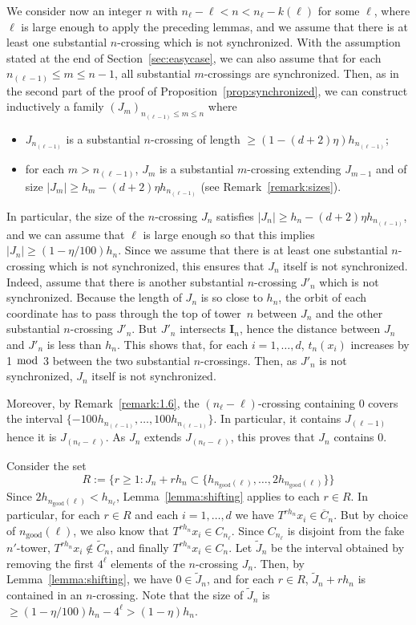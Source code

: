 \documentclass[10pt]{amsart}
\theoremstyle{definition}\newtheorem{defi}[theo]{Definition}\newtheorem{rema}[theo]{Remark}\newtheorem{exam}[theo]{Example}\newtheorem{exem}[theo]{Example}\newtheorem{nota}[theo]{Notation}
\newcommand{\egdef}{:=}
\newcommand{\ngood}{n_{\text{good}}}
\newcommand{\ci}{\boldsymbol I}
\begin{document}
We consider now an integer $n$ with $n_\ell-\ell<n<n_\ell-k(\ell)$ for some $\ell$, where $\ell$ is large enough to apply the preceding lemmas, and we assume that there is at least one substantial $n$-crossing which is not synchronized. With the assumption stated at the end of Section~\ref{sec:easycase}, we can also assume that for each $n_{(\ell-1)}\le m\le n-1$, all substantial $m$-crossings are synchronized. Then, as in the second part of the proof of Proposition~\ref{prop:synchronized}, we can construct inductively a family $(J_m)_{n_{(\ell-1)}\le m\le n}$ where
\begin{itemize}
\item $J_{n_{(\ell-1)}}$ is a substantial $n$-crossing of length $\ge (1-(d+2)\eta)h_{n_{(\ell-1)}}$;
\item for each $m>n_{(\ell-1)}$, $J_m$ is a substantial $m$-crossing extending $J_{m-1}$ and of size $|J_m|\ge h_m-(d+2)\eta h_{n_{(\ell-1)}}$ (see Remark~\ref{remark:sizes}).
\end{itemize}
In particular, the size of the $n$-crossing $J_n$ satisfies $|J_n|\ge h_n-(d+2)\eta h_{n_{(\ell-1)}}$, and we can assume that $\ell$ is large enough so that this implies $|J_n|\ge (1-\eta/100)h_n$. Since we assume that there is at least one substantial $n$-crossing which is not synchronized, this ensures that $J_n$ itself is not synchronized. Indeed, assume that there is another substantial $n$-crossing $J'_n$ which is not synchronized. Because the length of $J_n$ is so close to $h_n$, the orbit of each coordinate has to pass through the top of tower~$n$ between $J_n$ and the other substantial $n$-crossing $J'_n$. But $J'_n$ intersects $\ci_n$, hence the distance between $J_n$ and $J'_n$ is less than $h_n$. This shows that, for each $i=1,\ldots,d$, $t_n(x_i)$ increases by 1 $\bmod$ 3 between the two substantial $n$-crossings. Then, as $J'_n$ is not synchronized, $J_n$ itself is not synchronized.


Moreover, by Remark~\ref{remark:1.6}, the $(n_\ell-\ell)$-crossing containing 0 covers the interval $\{-100 h_{n_{(\ell-1)}},\ldots, 100 h_{n_{(\ell-1)}}\}$. In particular, it contains $J_{(\ell-1)}$ hence it is $J_{(n_\ell-\ell)}$. As $J_n$ extends $J_{(n_\ell-\ell)}$, this proves that $J_n$ contains 0.

Consider the set
\[
R\egdef \bigl\{r\ge1: J_n+rh_n\subset\{h_{\ngood(\ell)},\ldots,2h_{\ngood(\ell)}\} \bigr\}
\]
Since $2h_{\ngood(\ell)}<h_{n_\ell}$, Lemma~\ref{lemma:shifting} applies to each $r\in R$. In particular, for each $r\in R$ and each $i=1,\ldots,d$ we have $T^{rh_n}x_i\in\overline{C}_n$. But by choice of $\ngood(\ell)$, we also know that $T^{rh_n}x_i\in C_{n_\ell}$. Since $C_{n_\ell}$ is disjoint from the fake $n'$-tower, $T^{rh_n}x_i\notin \tilde C_n$, and finally $T^{rh_n}x_i\in C_n$. Let $\tilde J_n$ be the interval obtained by removing the first $4^\ell$ elements of the $n$-crossing $J_n$. Then, by Lemma~\ref{lemma:shifting}, we have $0\in\tilde J_n$, and for each $r\in R$, $\tilde J_n+rh_n$ is contained in an $n$-crossing. Note that the size of $\tilde J_n$ is $\ge (1-\eta/100)h_n-4^\ell>(1-\eta) h_n$.
\end{document}
